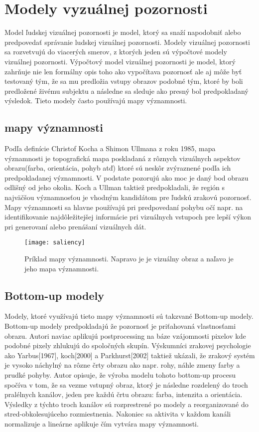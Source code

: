 \documentclass[10pt,twoside,slovak,a4paper]{article}
\begin{document}
\section{Modely vyzuálnej pozornosti} \label{1modely}
Model ľudskej vizuálnej pozornosti je model, ktorý sa snaží napodobniť alebo predpovedať správanie ludskej vizuálnej pozornosti. Modely vizuálnej pozornosti sa rozvetvujú do viacerých smerov, z ktorých jeden sú výpočtové modely vizuálnej pozornosti. Výpočtový model vizuálnej pozornosti je model, ktorý zahrňuje nie len formálny opis toho ako vypočítava pozornosť ale aj môže byť testovaný tým, že sa mu predložia vstupy obrazov podobné tým, ktoré by boli predložené živému subjektu a následne sa sleduje ako presný bol predpokladaný výsledok. Tieto modely často používajú mapy významnosti.%
\subsection{mapy významnosti} \label{ina:nejake}
Podľa definície Christof Kocha a Shimon Ullmana z roku 1985, mapa významnosti je topografická mapa poskladaná z rôznych vizuálnych aspektov obrazu(farba, orientácia, pohyb atď) ktoré sú neskôr zvýraznené podľa ich predpokladanej významnosti. V podstate pozorujú ako moc je daný bod obrazu odlišný od jeho okolia. Koch a Ullman taktiež predpokladali, že región s najväčšou významnosťou je vhodným kandidátom pre ľudskú zrakovú pozornosť. Mapy významnosti sa hlavne používajú pri predpovedaní pohybu očí napr. na identifikovanie najdôležitejšej informácie pri vizuálnych vstupoch pre lepší výkon pri generovaní alebo prenášaní vizuálnych dát.%
\begin{figure*}[tbh]
\centering
\texttt{[image: saliency]}
\caption{Príklad mapy významnosti. Napravo je je vizuálny obraz a naľavo je jeho mapa významnosti.}
\label{f:rozhod}
\end{figure*}
\subsection{Bottom-up modely} \label{ina}
Modely, ktoré využívajú tieto mapy významnosti sú takzvané Bottom-up modely. Bottom-up modely predpokladajú že pozornosť je priťahovaná vlastnosťami obrazu. Autori\cite{bottom} naviac aplikujú postprocessing na báze vzájomnosti pixelov kde podobné pixely zhlukujú do spoločných skupín. Výskumníci zrakovej psychologie ako Yarbus[1967], koch[2000] a Parkhurst[2002] taktiež ukázali, že zrakový systém je vysoko náchylný na rôzne črty obrazu ako napr. rohy, náhle zmeny farby a prudké pohyby. Autor\cite{saliency:vytvar} opisuje, že výroba modelu tohoto bottom-up procesu spočíva v tom, že sa vezme vstupný obraz, ktorý je následne rozdelený do troch pralélnych kanálov, jeden pre každú črtu obrazu: farba, intenzita a orientácia. Výsledky z týchto troch kanálov sú rozprestrené po modely a reorganizované do stred-obkolesujúceho rozmiestnenia. Nakoniec sa aktivita v každom kanáli normalizuje a lineárne aplikuje čím vytvára mapy významnosti.%
\end{document}
